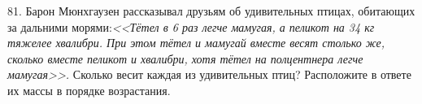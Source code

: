 81. Барон Мюнхгаузен рассказывал друзьям об удивительных птицах, обитающих за дальними морями:{\it <<Тётел в 6 раз легче мамугая, а пеликот на 34 кг тяжелее хвалибри. При этом тётел и мамугай вместе весят столько же, сколько вместе пеликот и хвалибри, хотя тётел на полцентнера легче мамугая>>.} Сколько весит каждая из удивительных птиц? Расположите в ответе их массы в порядке возрастания.\\
